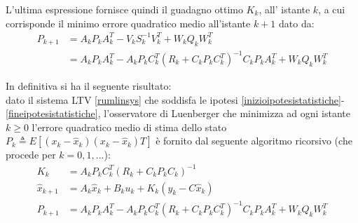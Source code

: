 \noindent L'ultima espressione fornisce quindi il guadagno ottimo $K_k$, all' istante $k$, a cui corrisponde il minimo errore quadratico medio all'istante $k+1$ dato da:
\begin{equation}
\begin{split}
P_{k+1}&=A_kP_kA_k^T-V_kS^{-1}_kV^T_k+W_kQ_kW_k^T\\ 
&=A_kP_kA_k^T-A_kP_kC_k^T(R_k+C_kP_kC_k^T)^{-1}C_kP_kA_k^T+W_kQ_kW_k^T
\end{split}
\end{equation}

\noindent In definitiva si ha il seguente risultato: \\
dato il sistema LTV \eqref{rumlinsys} che soddisfa le ipotesi \eqref{inizioipotesistatistiche}-\eqref{fineipotesistatistiche}, l'osservatore di Luenberger che minimizza ad ogni istante $k \geq 0$ l'errore quadratico medio di stima dello stato $P_k \triangleq E [(x_k - \hat{x}_k) (x_k - \hat{x}_k)T ]$ è fornito dal seguente algoritmo ricorsivo (che procede per $k = 0,1,...$):
\begin{align}
K_k &= A_kP_kC_k^T(R_k+C_kP_kC_k)^{-1} \\
\hat{x}_{k+1} &= A_k\hat{x}_k+B_ku_k+K_k(y_k-C\hat{x}_k)\\
P_{k+1}&=A_kP_kA_k^T-A_kP_kC_k^T(R_k+C_kP_kC_k^T)^{-1}C_kP_kA_k^T+W_kQ_kW_k^T
\end{align}
\newpage